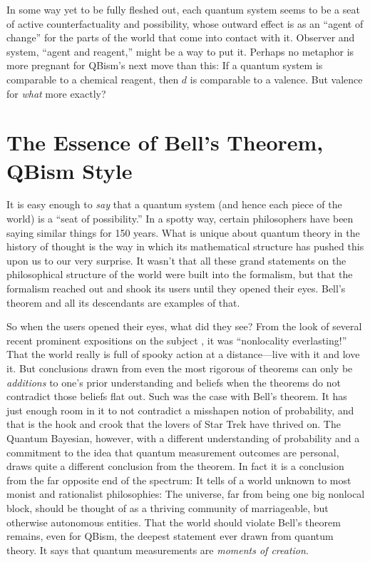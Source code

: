 In some way yet to be fully fleshed out, each quantum system seems to be a seat of active coun\-ter\-factuality and possibility, whose outward effect is as an ``agent of change'' for the parts of the world that come into contact with it.  Observer and system, ``agent and reagent,'' might be a way to put it.  Perhaps no metaphor is more pregnant for QBism's next move than this:  If a quantum system is comparable to a chemical reagent, then $d$ is comparable to a valence.  But valence for {\it what\/} more exactly?

\section{The Essence of Bell's Theorem, QBism Style}

\label{BellTheorem}

It is easy enough to {\it say\/} that a quantum system (and hence each piece of the world) is a ``seat of possibility.''  In a spotty way, certain philosophers have been saying similar things for 150 years.  What is unique about quantum theory in the history of thought is the way in which its mathematical structure has pushed this upon us to our very surprise.  It wasn't that all these grand statements on the philosophical structure of the world were built into the formalism, but that the formalism reached out and shook its users until they opened their eyes.  Bell's theorem and all its descendants are examples of that.

So when the users opened their eyes, what did they see?  From the look of several recent prominent expositions on the subject \cite{Gisin09,Albert09,Norsen06}, it was ``nonlocality everlasting!''  That the world really is full of spooky action at a distance---live with it and love it.  But conclusions drawn from even the most rigorous of theorems can only be {\it additions\/} to one's prior understanding and beliefs when the theorems do not contradict those beliefs flat out.  Such was the case with Bell's theorem.  It has just enough room in it to not contradict a misshapen notion of probability, and that is the hook and crook that the lovers of Star Trek have thrived on.  The Quantum Bayesian, however, with a different understanding of probability and a commitment to the idea that quantum measurement outcomes are personal, draws quite a different conclusion from the theorem.  In fact it is a conclusion from the far opposite end of the spectrum:  It tells of a world unknown to most monist and rationalist philosophies:  The universe, far from being one big nonlocal block, should be thought of as a thriving community of marriageable, but otherwise autonomous entities.   That the world should violate Bell's theorem remains, even for QBism, the deepest statement ever drawn from quantum theory.  It says that quantum measurements are {\it moments of creation}.

